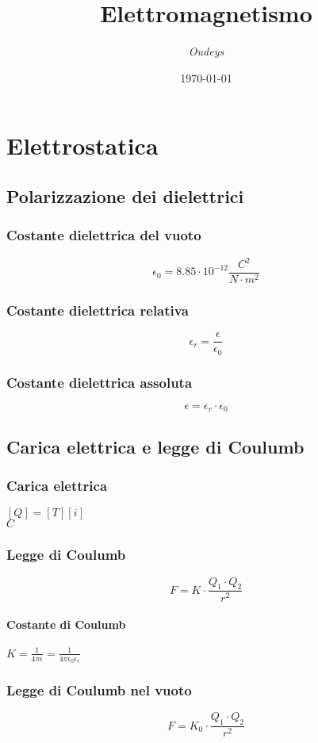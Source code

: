 \documentclass[a4paper,12pt]{article}
\title{\textbf{Elettromagnetismo}}
\author{\textit{Oudeys}}
\date{\today}
\theoremstyle{mystyle}
\begin{document}
\maketitle

\tableofcontents
\newpage


\section{Elettrostatica}
\subsection{Polarizzazione dei dielettrici}
\subsubsection{Costante dielettrica del vuoto}
\[\epsilon_0 = 8.85 \cdot 10^{-12} \frac{C^2}{N \cdot m^2}\]
\subsubsection{Costante dielettrica relativa}
\[\epsilon_r = \frac{\epsilon}{\epsilon_0}\]
\subsubsection{Costante dielettrica assoluta}
\[\epsilon = \epsilon_r \cdot \epsilon_0\]

\newpage

\subsection{Carica elettrica e legge di Coulumb}
\subsubsection{Carica elettrica}
\([Q]=[T][i]\)\\
\(C\)
\subsubsection{Legge di Coulumb}
\[F = K \cdot \frac{Q_1 \cdot Q_2}{r^2}\]
\paragraph{Costante di Coulumb}
\(K = \frac{1}{4 \pi \epsilon} = \frac{1}{4\pi \epsilon_0 \epsilon_r}\)
\subsubsection{Legge di Coulumb nel vuoto}
\[F = K_0 \cdot \frac{Q_1 \cdot Q_2}{r^2}\]
\end{document}
